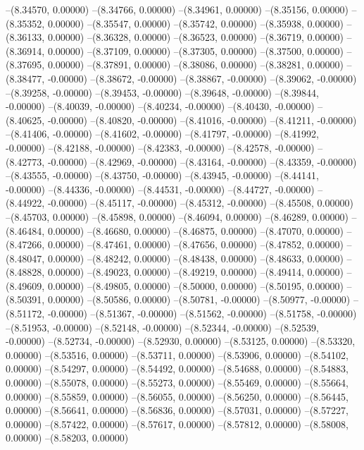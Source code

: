 --(8.34570, 0.00000)
--(8.34766, 0.00000)
--(8.34961, 0.00000)
--(8.35156, 0.00000)
--(8.35352, 0.00000)
--(8.35547, 0.00000)
--(8.35742, 0.00000)
--(8.35938, 0.00000)
--(8.36133, 0.00000)
--(8.36328, 0.00000)
--(8.36523, 0.00000)
--(8.36719, 0.00000)
--(8.36914, 0.00000)
--(8.37109, 0.00000)
--(8.37305, 0.00000)
--(8.37500, 0.00000)
--(8.37695, 0.00000)
--(8.37891, 0.00000)
--(8.38086, 0.00000)
--(8.38281, 0.00000)
--(8.38477, -0.00000)
--(8.38672, -0.00000)
--(8.38867, -0.00000)
--(8.39062, -0.00000)
--(8.39258, -0.00000)
--(8.39453, -0.00000)
--(8.39648, -0.00000)
--(8.39844, -0.00000)
--(8.40039, -0.00000)
--(8.40234, -0.00000)
--(8.40430, -0.00000)
--(8.40625, -0.00000)
--(8.40820, -0.00000)
--(8.41016, -0.00000)
--(8.41211, -0.00000)
--(8.41406, -0.00000)
--(8.41602, -0.00000)
--(8.41797, -0.00000)
--(8.41992, -0.00000)
--(8.42188, -0.00000)
--(8.42383, -0.00000)
--(8.42578, -0.00000)
--(8.42773, -0.00000)
--(8.42969, -0.00000)
--(8.43164, -0.00000)
--(8.43359, -0.00000)
--(8.43555, -0.00000)
--(8.43750, -0.00000)
--(8.43945, -0.00000)
--(8.44141, -0.00000)
--(8.44336, -0.00000)
--(8.44531, -0.00000)
--(8.44727, -0.00000)
--(8.44922, -0.00000)
--(8.45117, -0.00000)
--(8.45312, -0.00000)
--(8.45508, 0.00000)
--(8.45703, 0.00000)
--(8.45898, 0.00000)
--(8.46094, 0.00000)
--(8.46289, 0.00000)
--(8.46484, 0.00000)
--(8.46680, 0.00000)
--(8.46875, 0.00000)
--(8.47070, 0.00000)
--(8.47266, 0.00000)
--(8.47461, 0.00000)
--(8.47656, 0.00000)
--(8.47852, 0.00000)
--(8.48047, 0.00000)
--(8.48242, 0.00000)
--(8.48438, 0.00000)
--(8.48633, 0.00000)
--(8.48828, 0.00000)
--(8.49023, 0.00000)
--(8.49219, 0.00000)
--(8.49414, 0.00000)
--(8.49609, 0.00000)
--(8.49805, 0.00000)
--(8.50000, 0.00000)
--(8.50195, 0.00000)
--(8.50391, 0.00000)
--(8.50586, 0.00000)
--(8.50781, -0.00000)
--(8.50977, -0.00000)
--(8.51172, -0.00000)
--(8.51367, -0.00000)
--(8.51562, -0.00000)
--(8.51758, -0.00000)
--(8.51953, -0.00000)
--(8.52148, -0.00000)
--(8.52344, -0.00000)
--(8.52539, -0.00000)
--(8.52734, -0.00000)
--(8.52930, 0.00000)
--(8.53125, 0.00000)
--(8.53320, 0.00000)
--(8.53516, 0.00000)
--(8.53711, 0.00000)
--(8.53906, 0.00000)
--(8.54102, 0.00000)
--(8.54297, 0.00000)
--(8.54492, 0.00000)
--(8.54688, 0.00000)
--(8.54883, 0.00000)
--(8.55078, 0.00000)
--(8.55273, 0.00000)
--(8.55469, 0.00000)
--(8.55664, 0.00000)
--(8.55859, 0.00000)
--(8.56055, 0.00000)
--(8.56250, 0.00000)
--(8.56445, 0.00000)
--(8.56641, 0.00000)
--(8.56836, 0.00000)
--(8.57031, 0.00000)
--(8.57227, 0.00000)
--(8.57422, 0.00000)
--(8.57617, 0.00000)
--(8.57812, 0.00000)
--(8.58008, 0.00000)
--(8.58203, 0.00000)
